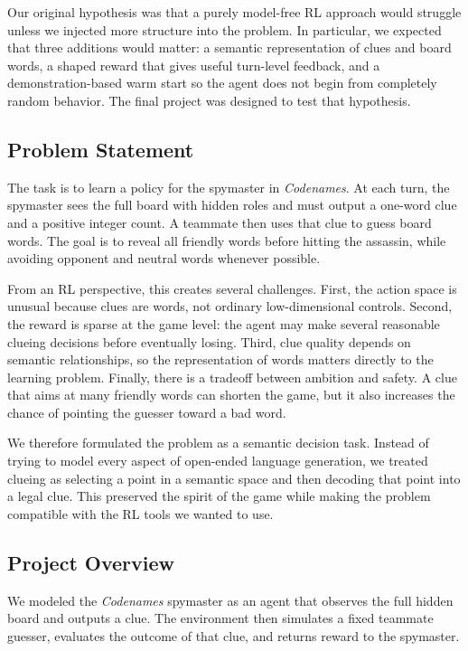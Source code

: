 \documentclass[9pt]{article}
\begin{document}
Our original hypothesis was that a purely model-free RL approach would
struggle unless we injected more structure into the problem. In
particular, we expected that three additions would matter: a semantic
representation of clues and board words, a shaped reward that gives
useful turn-level feedback, and a demonstration-based warm start so the
agent does not begin from completely random behavior. The final project
was designed to test that hypothesis.

\subsection{Problem Statement}\label{problem-statement}

The task is to learn a policy for the spymaster in \emph{Codenames}. At
each turn, the spymaster sees the full board with hidden roles and must
output a one-word clue and a positive integer count. A teammate then
uses that clue to guess board words. The goal is to reveal all friendly
words before hitting the assassin, while avoiding opponent and neutral
words whenever possible.

From an RL perspective, this creates several challenges. First, the
action space is unusual because clues are words, not ordinary
low-dimensional controls. Second, the reward is sparse at the game
level: the agent may make several reasonable clueing decisions before
eventually losing. Third, clue quality depends on semantic
relationships, so the representation of words matters directly to the
learning problem. Finally, there is a tradeoff between ambition and
safety. A clue that aims at many friendly words can shorten the game,
but it also increases the chance of pointing the guesser toward a bad
word.

We therefore formulated the problem as a semantic decision task. Instead
of trying to model every aspect of open-ended language generation, we
treated clueing as selecting a point in a semantic space and then
decoding that point into a legal clue. This preserved the spirit of the
game while making the problem compatible with the RL tools we wanted to
use.

\subsection{Project Overview}\label{what-we-did}

We modeled the \emph{Codenames} spymaster as an agent that observes the full
hidden board and outputs a clue. The environment then simulates a fixed
teammate guesser, evaluates the outcome of that clue, and returns reward
to the spymaster.
\end{document}
